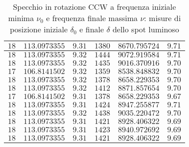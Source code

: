\documentclass{article} %
\begin{document}
\begin{table}
\begin{tabular}{||c|c|c||c|c|c||}
            $18$ & $113.0973355$ & $9.31$ & $1380$ & $8670.795724$ & $9.71$ \\\hline
            $18$ & $113.0973355$ & $9.32$ & $1444$ & $9072.919584$ & $9.71$ \\\hline
            $18$ & $113.0973355$ & $9.32$ & $1435$ & $9016.370916$ & $9.70$ \\\hline
            $17$ & $106.8141502$ & $9.32$ & $1359$ & $8538.848832$ & $9.70$ \\\hline
            $18$ & $113.0973355$ & $9.32$ & $1378$ & $8658.229353$ & $9.70$ \\\hline
            $18$ & $113.0973355$ & $9.32$ & $1412$ & $8871.857654$ & $9.70$ \\\hline
            $17$ & $106.8141502$ & $9.31$ & $1378$ & $8658.229353$ & $9.67$ \\\hline
            $18$ & $113.0973355$ & $9.31$ & $1424$ & $8947.255877$ & $9.71$ \\\hline
            $18$ & $113.0973355$ & $9.32$ & $1438$ & $9035.220472$ & $9.70$ \\\hline
            $18$ & $113.0973355$ & $9.31$ & $1421$ & $8928.406322$ & $9.69$ \\\hline
            $18$ & $113.0973355$ & $9.31$ & $1423$ & $8940.972692$ & $9.69$ \\\hline
            $18$ & $113.0973355$ & $9.31$ & $1421$ & $8928.406322$ & $9.69$ \\\hline
        \end{tabular}
        \caption{Specchio in rotazione CCW a frequenza iniziale minima $\nu_0$ e frequenza finale massima $\nu$: misure di posizione iniziale $\delta_0$ e finale $\delta$ dello spot luminoso}
        \label{CCW_min_max-delta-omega}
    \end{table}
\end{document}
